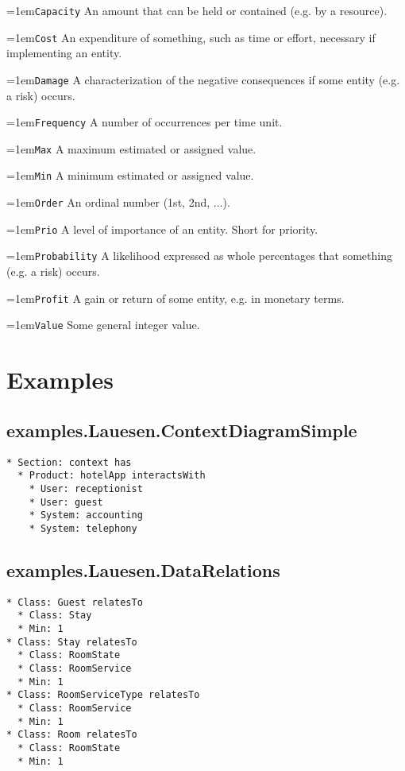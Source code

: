 \documentclass[a4paper,oneside]{article}
\newcommand\Concept[2]{\hangindent=1em\lstinline+#1+ #2}
\begin{document}
\begin{multicols*}{4}
\Concept{Capacity}{An amount that can be held or contained (e.g. by a resource).}

\Concept{Cost}{An expenditure of something, such as time or effort, necessary if implementing an entity.}

\Concept{Damage}{A characterization of the negative consequences if some entity (e.g. a risk) occurs.}

\Concept{Frequency}{A number of occurrences per time unit. }

\Concept{Max}{A maximum estimated or assigned value.}

\Concept{Min}{A minimum estimated or assigned value.}

\Concept{Order}{An ordinal number (1st, 2nd, ...).}

\Concept{Prio}{A level of importance of an entity. Short for priority.}

\Concept{Probability}{A likelihood expressed as whole percentages that something (e.g. a risk) occurs.}

\Concept{Profit}{A gain or return of some entity, e.g. in monetary terms.}

\Concept{Value}{Some general integer value.}
 

\section*{Examples}

\subsection*{examples.Lauesen.ContextDiagramSimple}
\begin{lstlisting}
* Section: context has
  * Product: hotelApp interactsWith
    * User: receptionist
    * User: guest
    * System: accounting
    * System: telephony

\end{lstlisting}


\subsection*{examples.Lauesen.DataRelations}
\begin{lstlisting}
* Class: Guest relatesTo
  * Class: Stay
  * Min: 1
* Class: Stay relatesTo
  * Class: RoomState
  * Class: RoomService
  * Min: 1
* Class: RoomServiceType relatesTo
  * Class: RoomService
  * Min: 1
* Class: Room relatesTo
  * Class: RoomState
  * Min: 1


\end{lstlisting}
\end{multicols*}
\end{document}
